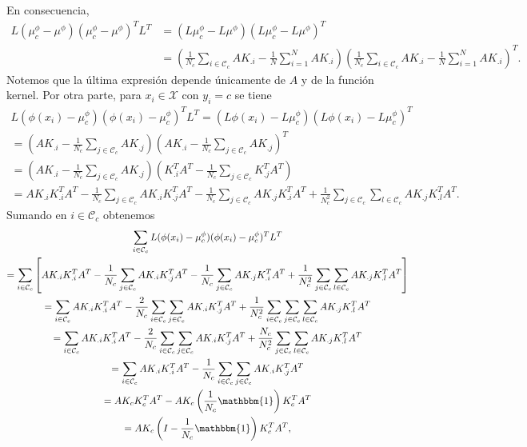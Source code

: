 En consecuencia,
\begin{align*}
    L(\mu_c^{\phi} - \mu^{\phi})(\mu_c^{\phi} - \mu^{\phi})^TL^T &= (L\mu_c^{\phi} - L\mu^{\phi})(L\mu_c^{\phi} - L\mu^{\phi})^T \\
                                     &=  \left( \frac{1}{N_c}\sum_{i \in \mathcal{C}_c} AK_{.i} - \frac{1}{N}\sum_{i=1}^N AK_{.i} \right)\left( \frac{1}{N_c}\sum_{i \in \mathcal{C}_c} AK_{.i} - \frac{1}{N}\sum_{i=1}^N AK_{.i} \right)^T.
\end{align*}
Notemos que la última expresión depende únicamente de $A$ y de la función kernel. Por otra parte, para $x_i \in \mathcal{X}$ con $y_i = c$ se tiene
\begin{multline*}
    L(\phi(x_i) - \mu_c^{\phi})(\phi(x_i) - \mu_c^{\phi})^TL^T = (L\phi(x_i) - L\mu_c^{\phi})(L\phi(x_i) - L\mu_c^{\phi})^T \\
                                     = \left(AK_{.i} - \frac{1}{N_c}\sum_{j \in \mathcal{C}_c} AK_{.j} \right)\left(AK_{.i} - \frac{1}{N_c}\sum_{j \in \mathcal{C}_c} AK_{.j} \right)^T \\
                                     = \left(AK_{.i} - \frac{1}{N_c}\sum_{j \in \mathcal{C}_c} AK_{.j} \right)\left(K_{.i}^TA^T - \frac{1}{N_c}\sum_{j \in \mathcal{C}_c} K_{.j}^TA^T \right) \\
                                     = AK_{.i}K_{.i}^TA^T - \frac{1}{N_c}\sum_{j\in \mathcal{C}_c}AK_{.i}K_{.j}^TA^T - \frac{1}{N_c}\sum_{j\in \mathcal{C}_c}AK_{.j}K_{.i}^TA^T + \frac{1}{N_c^2}\sum_{j \in \mathcal{C}_c}\sum_{l \in \mathcal{C}_c}AK_{.j}K_{.l}^TA^T.
\end{multline*}
Sumando en $i \in \mathcal{C}_c$ obtenemos
\begin{multline*}
    \sum_{i\in\mathcal{C}_c}L(\phi(x_i) - \mu_c^{\phi})(\phi(x_i) - \mu_c^{\phi})^TL^T \\
    = \sum_{i \in \mathcal{C}_c}\left[AK_{.i}K_{.i}^TA^T - \frac{1}{N_c}\sum_{j\in \mathcal{C}_c}AK_{.i}K_{.j}^TA^T - \frac{1}{N_c}\sum_{j\in \mathcal{C}_c}AK_{.j}K_{.i}^TA^T + \frac{1}{N_c^2}\sum_{j \in \mathcal{C}_c}\sum_{l \in \mathcal{C}_c}AK_{.j}K_{.l}^TA^T\right] \\
            = \sum_{i \in \mathcal{C}_c}AK_{.i}K_{.i}^TA^T - \frac{2}{N_c}\sum_{i \in \mathcal{C}_c}\sum_{j \in \mathcal{C}_c}AK_{.i}K_{.j}^TA^T + \frac{1}{N_c^2}\sum_{i \in \mathcal{C}_c}\sum_{j \in \mathcal{C}_c}\sum_{l \in \mathcal{C}_c}AK_{.j}K_{.l}^TA^T \\
            = \sum_{i \in \mathcal{C}_c}AK_{.i}K_{.i}^TA^T - \frac{2}{N_c}\sum_{i \in \mathcal{C}_c}\sum_{j \in \mathcal{C}_c}AK_{.i}K_{.j}^TA^T + \frac{N_c}{N_c^2}\sum_{j \in \mathcal{C}_c}\sum_{l \in \mathcal{C}_c}AK_{.j}K_{.l}^TA^T \\
            = \sum_{i \in \mathcal{C}_c}AK_{.i}K_{.i}^TA^T - \frac{1}{N_c}\sum_{i \in \mathcal{C}_c}\sum_{j \in \mathcal{C}_c}AK_{.i}K_{.j}^TA^T \\
            = AK_cK_c^TA^T - AK_c\left(\frac{1}{N_c}\mathbbm{1}\right)K_c^TA^T \\
            = AK_c\left(I - \frac{1}{N_c}\mathbbm{1}\right)K_c^TA^T,
\end{multline*}

